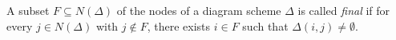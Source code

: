 A subset $F \subseteq N(\Delta)$ of the nodes of a diagram scheme $\Delta$ is called \emph{final} if for every $j \in N(\Delta)$ with $j \notin F$, there exists $i \in F$ such that $\Delta(i, j) \neq \emptyset$.
